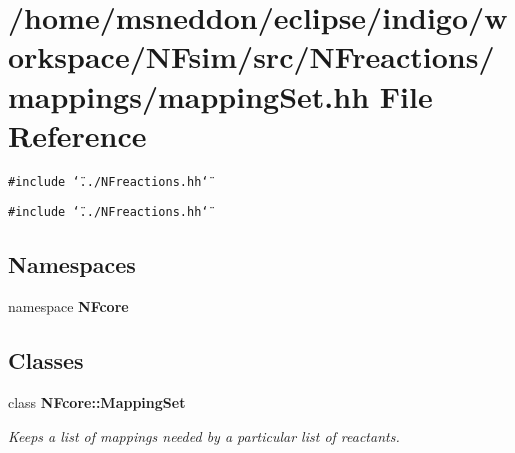 \section{/home/msneddon/eclipse/indigo/workspace/NFsim/src/NFreactions/mappings/mappingSet.hh File Reference}
\label{mappingSet_8hh}


{\tt \#include \char`\"{}../NFreactions.hh\char`\"{}}\par
{\tt \#include \char`\"{}../NFreactions.hh\char`\"{}}\par
\subsection*{Namespaces}
\begin{CompactItemize}
\item 
namespace {\bf NFcore}
\end{CompactItemize}
\subsection*{Classes}
\begin{CompactItemize}
\item 
class {\bf NFcore::MappingSet}
\begin{CompactList}\small\item\em Keeps a list of mappings needed by a particular list of reactants. \item\end{CompactList}\end{CompactItemize}
